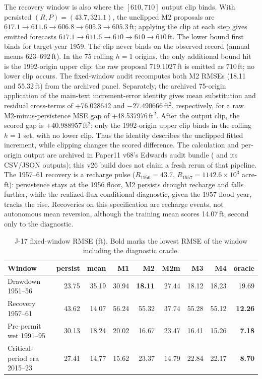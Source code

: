 \documentclass[11pt]{article}
\begin{document}
The recovery window is also where the $[610,710]$ output clip binds. With persisted $(R,P)=(43.7,321.1)$, the unclipped M2 proposals are $617.1\to611.6\to606.8\to605.3\to605.3$\,ft; applying the clip at each step gives emitted forecasts $617.1\to611.6\to610\to610\to610$\,ft. The lower bound first binds for target year 1959. The clip never binds on the observed record (annual means 623--692\,ft). In the 75 rolling $h=1$ origins, the only additional bound hit is the 1992-origin upper clip: the raw proposal $719.1027$\,ft is emitted as $710$\,ft; no lower clip occurs. The fixed-window audit recomputes both M2 RMSEs (18.11 and 55.32\,ft) from the archived panel. Separately, the archived 75-origin application of the main-text increment-error identity gives mean substitution and residual cross-terms of +76.028642 and $-27.490666$\,ft$^2$, respectively, for a raw M2-minus-persistence MSE gap of +48.537976\,ft$^2$. After the output clip, the scored gap is +40.988957\,ft$^2$; only the 1992-origin upper clip binds in the rolling $h=1$ set, with no lower clip. Thus the identity describes the unclipped fitted increment, while clipping changes the scored difference. The calculation and per-origin output are archived in Paper11 v68's Edwards audit bundle ( and its CSV/JSON outputs); this v26 build does not claim a fresh rerun of that pipeline. The 1957--61 recovery is a recharge pulse ($R_{1956}=43.7$, $R_{1957}=1142.6\times10^3$ acre-ft): persistence stays at the 1956 floor, M2 persists drought recharge and falls further, while the realized-flux conditional diagnostic, given the 1957 flood year, tracks the rise. Recoveries on this specification are recharge events, not autonomous mean reversion, although the training mean scores 14.07\,ft, second only to the diagnostic.

\begin{table}[!htb]
\centering\small
\caption{J-17 fixed-window RMSE (ft). Bold marks the lowest RMSE of the window including the diagnostic oracle.}
\label{tab:si_edwfixed}
\begin{tabular}{@{}lrrrrrrrr@{}}
\toprule
Window & persist & mean & M1 & M2 & M2m & M3 & M4 & oracle \\
\midrule
Drawdown 1951--56 & 23.75 & 35.19 & 30.94 & \textbf{18.11} & 27.44 & 18.12 & 18.23 & 19.69 \\
Recovery 1957--61 & 43.62 & 14.07 & 56.24 & 55.32 & 37.74 & 55.28 & 55.12 & \textbf{12.26} \\
Pre-permit wet 1991--95 & 30.13 & 18.24 & 20.02 & 16.67 & 23.47 & 16.41 & 15.26 & \textbf{7.18} \\
Critical-period era 2015--23 & 27.41 & 14.77 & 15.62 & 23.37 & 14.79 & 22.84 & 22.17 & \textbf{8.70} \\
\bottomrule
\end{tabular}
\end{table}
\end{document}
